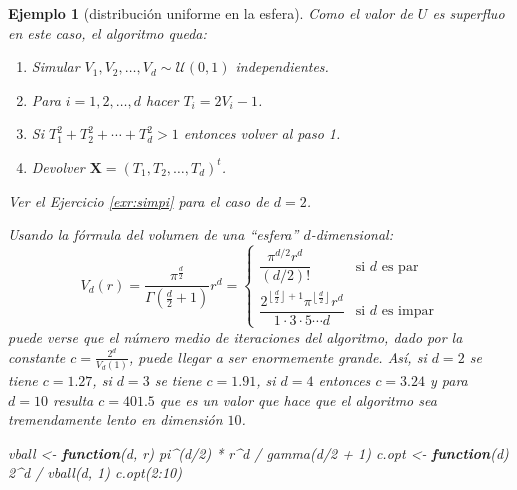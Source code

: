 \documentclass[
  10pt,
]{book}
\newenvironment{Shaded}{\begin{snugshade}}{\end{snugshade}}
\newcommand{\ControlFlowTok}[1]{\textcolor[rgb]{0.13,0.29,0.53}{\textbf{#1}}}
\newcommand{\DecValTok}[1]{\textcolor[rgb]{0.00,0.00,0.81}{#1}}
\newcommand{\FunctionTok}[1]{\textcolor[rgb]{0.00,0.00,0.00}{#1}}
\newcommand{\NormalTok}[1]{#1}
\newcommand{\OtherTok}[1]{\textcolor[rgb]{0.56,0.35,0.01}{#1}}
\newcommand{\SpecialCharTok}[1]{\textcolor[rgb]{0.00,0.00,0.00}{#1}}
\renewcommand{\mathbf}[1]{\symbf{#1}}
\theoremstyle{break}
\newtheorem{example}{Ejemplo}[chapter]
\theoremstyle{nonumberplain}
\begin{document}
\begin{example}[distribución uniforme en la esfera]
Como el valor de \(U\) es superfluo en este caso, el algoritmo queda:

\begin{enumerate}
\def\labelenumi{\arabic{enumi}.}
\item
  Simular \(V_1, V_2, \ldots, V_d \sim \mathcal{U}(0,1)\) independientes.
\item
  Para \(i = 1, 2, \ldots, d\) hacer \(T_i = 2V_i - 1\).
\item
  Si \(T_1^2 + T_2^2 + \cdots + T_d^2 > 1\) entonces volver al paso 1.
\item
  Devolver \(\mathbf{X} = \left( T_1, T_2, \ldots, T_d \right)^t\).
\end{enumerate}

Ver el Ejercicio \ref{exr:simpi} para el caso de \(d=2\).

Usando la fórmula del volumen de una ``esfera'' \(d\)-dimensional:
\[V_d (r) = \frac{\pi^\frac{d}{2}}{\Gamma\left(\frac{d}{2} + 1\right)}r^d= \left\{
\begin{array}{ll}
\dfrac{\pi^{d/2}r^d}{\left( d/2\right)  !} & \text{si } d \text{ es par}\\
\dfrac{2^{\left\lfloor \frac{d}{2}\right\rfloor +1}\pi^{\left\lfloor \frac{d}{2}\right\rfloor }r^d}{1\cdot3\cdot5\cdots d} & \text{si } d \text{ es impar}
\end{array}\right.\]
puede verse que el número medio de iteraciones del algoritmo, dado por la constante \(c = \frac{2^d}{V_d (1)}\), puede llegar a ser enormemente grande.
Así, si \(d=2\) se tiene \(c=1.27\), si \(d=3\) se tiene \(c=1.91\), si \(d=4\) entonces \(c=3.24\) y para \(d=10\) resulta \(c=401.5\) que es un valor que hace que el algoritmo sea tremendamente lento en dimensión \(10\).

\begin{Shaded}
\begin{Highlighting}[]
\NormalTok{vball }\OtherTok{\textless{}{-}} \ControlFlowTok{function}\NormalTok{(d, r) pi}\SpecialCharTok{\^{}}\NormalTok{(d}\SpecialCharTok{/}\DecValTok{2}\NormalTok{) }\SpecialCharTok{*}\NormalTok{ r}\SpecialCharTok{\^{}}\NormalTok{d }\SpecialCharTok{/} \FunctionTok{gamma}\NormalTok{(d}\SpecialCharTok{/}\DecValTok{2} \SpecialCharTok{+} \DecValTok{1}\NormalTok{)}
\NormalTok{c.opt }\OtherTok{\textless{}{-}} \ControlFlowTok{function}\NormalTok{(d) }\DecValTok{2}\SpecialCharTok{\^{}}\NormalTok{d }\SpecialCharTok{/} \FunctionTok{vball}\NormalTok{(d, }\DecValTok{1}\NormalTok{)}
\FunctionTok{c.opt}\NormalTok{(}\DecValTok{2}\SpecialCharTok{:}\DecValTok{10}\NormalTok{)}
\end{Highlighting}
\end{Shaded}


\end{example}
\end{document}
